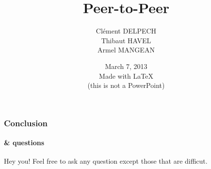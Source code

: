 \documentclass{beamer}
\title{Peer-to-Peer}
\author{%
  Clément \textsc{DELPECH} \\
  Thibaut \textsc{HAVEL}   \\
  Armel   \textsc{MANGEAN}
}
\institute{UPMC}
\date{%
  March 7, 2013 \\
  \vspace{1em}
  {\tiny Made with \LaTeX} \\
  \vspace{-0.4em}
  {\tiny (this is not a PowerPoint)}
}
\begin{document}
  \begin{frame}
    \titlepage
  \end{frame}

  
  
  

  \begin{frame}
    \frametitle{Conclusion}
    \framesubtitle{\& questions}

    \pause
    \begin{exampleblock}{Hey you!}
      Feel free to ask any question {\tiny except those that are difficut.}
    \end{exampleblock}
  \end{frame}
\end{document}

